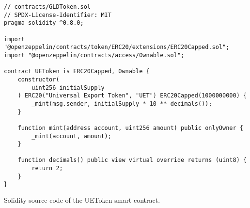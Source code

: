 \begin{listing}[!ht]
    \begin{verbatim}
// contracts/GLDToken.sol
// SPDX-License-Identifier: MIT
pragma solidity ^0.8.0;

import "@openzeppelin/contracts/token/ERC20/extensions/ERC20Capped.sol";
import "@openzeppelin/contracts/access/Ownable.sol";

contract UEToken is ERC20Capped, Ownable {
    constructor(
        uint256 initialSupply
    ) ERC20("Universal Export Token", "UET") ERC20Capped(1000000000) {
        _mint(msg.sender, initialSupply * 10 ** decimals());
    }

    function mint(address account, uint256 amount) public onlyOwner {
        _mint(account, amount);
    }

    function decimals() public view virtual override returns (uint8) {
        return 2;
    }
}
    \end{verbatim}
    \caption{Solidity source code of the UEToken smart contract.}
    \label{lst:uetoken_contract}
\end{listing}